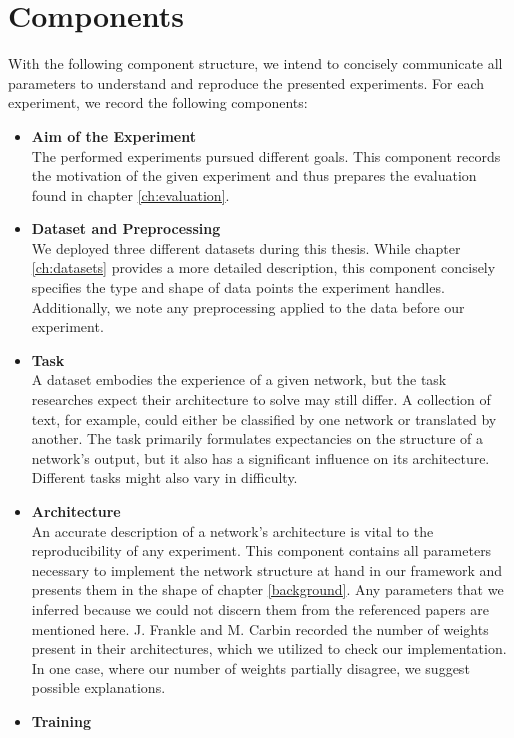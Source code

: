 \section{Components}
With the following component structure, we intend to concisely communicate all parameters to understand and reproduce the presented experiments. For each experiment, we record the following components:
\begin{itemize}
	\item \textbf{Aim of the Experiment}\\
	The performed experiments pursued different goals. This component records the motivation of the given experiment and thus prepares the evaluation found in chapter \ref{ch:evaluation}.\\
	\item \textbf{Dataset and Preprocessing}\\
	We deployed three different datasets during this thesis. While chapter \ref{ch:datasets} provides a more detailed description, this component concisely specifies the type and shape of data points the experiment handles. Additionally, we note any preprocessing applied to the data before our experiment.\\
	\item \textbf{Task}\\
	A dataset embodies the experience of a given network, but the task researches expect their architecture to solve may still differ. A collection of text, for example, could either be classified by one network or translated by another. The task primarily formulates expectancies on the structure of a network's output, but it also has a significant influence on its architecture. Different tasks might also vary in difficulty.\\
	\item \textbf{Architecture}\\
	An accurate description of a network's architecture is vital to the reproducibility of any experiment. This component contains all parameters necessary to implement the network structure at hand in our framework and presents them in the shape of chapter \ref{background}. Any parameters that we inferred because we could not discern them from the referenced papers are mentioned here.
	J. Frankle and M. Carbin recorded the number of weights present in their architectures, which we utilized to check our implementation. In one case, where our number of weights partially disagree, we suggest possible explanations.\\
	\item \textbf{Training}\\  

\end{itemize}
